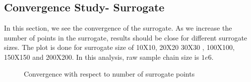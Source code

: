 \subsection{Convergence Study- Surrogate }

In this section, we see the convergence of the surrogate. As we increase the number of points in the surrogate, results should be close for different surrogate sizes. The plot is done for surrogate size of 10X10, 20X20 30X30 , 100X100, 150X150 and 200X200. In this analysis, raw sample chain size is $1e6$.

\begin{figure}[H]
            \caption{Convergence with respect to number of surrogate points}
\end{figure}

